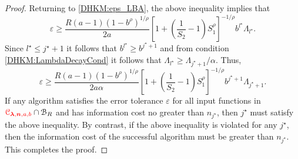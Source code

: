\documentclass[USenglish]{article}
\theoremstyle{dgthm}
\theoremstyle{dgthm}
\theoremstyle{dgthm}
\theoremstyle{dgthm}
\theoremstyle{dgdef}
\theoremstyle{definition}
\newcommand{\DHKMchange}[1]{{\color{red}{#1}}}
\begin{document}
\begin{proof}
Returning to \eqref{DHKM:eps_LBA}, the above inequality  implies that
\begin{equation*}
    \varepsilon 
\ge  \frac{R(a-1)(1 - b^\rho)^{1/\rho}}{2a} \left[1 + \left(\frac 1 {S_2} -1 \right) S_1^\rho \right]^{-1/\rho} b^{l^\star} \Lambda_{l^\star}.
\end{equation*}
Since $l^\star \le j^{\star}+1$ it follows that $ b^{l^\star} \ge b^{j^\star+1}$ and from condition \eqref{DHKM:LambdaDecayCond} it follows that $\Lambda_{l^\star} \ge \Lambda_{j^\star+1}/\alpha$.  Thus,
\begin{equation*}
    \varepsilon 
\ge  \frac{R(a-1)(1 - b^\rho)^{1/\rho}}{2a\alpha} \left[1 + \left(\frac 1 {S_2} -1 \right) S_1^\rho \right]^{-1/\rho} b^{j^\star+1} \Lambda_{j^\star+1}.
\end{equation*}
If any algorithm satisfies the error tolerance $\varepsilon$ for all input functions in $\DHKMchange{\calC_{\boldsymbol{\lambda},\bsn,a,b}} \cap \calB_R$ and has information cost no greater than $n_{j^\star}$, then $j^\star$ must satisfy the above inequality.  By contrast, if the above inequality is violated for any $j^\star$, then the information cost of the successful algorithm must be greater than $n_{j^\star}$.  This completes the proof.
\end{proof}
\end{document}
